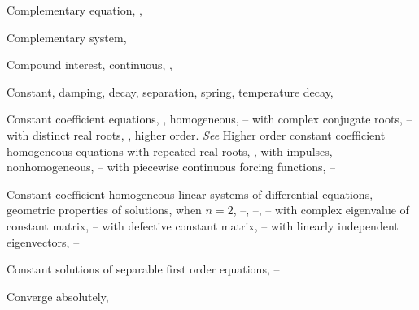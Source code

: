 \begin{theindex}
  \item Complementary equation, \pageref{eq:2.1.16}, \pageref{thmtype:9.1.5}

  \item Complementary system, \pageref{thmtype:10.7.1}

  \item Compound interest, continuous, \pageref{eq:4.1.7}, \pageref{example:4.1.2}

  \item Constant,
    \subitem damping, \pageref{eq:4.4.26}
    \subitem decay, \pageref{eq:4.1.3}
    \subitem separation, \pageref{eq:12.1.2}
    \subitem spring, \pageref{eq:6.1.1}
    \subitem temperature decay, \pageref{eq:4.2.1}

  \item Constant coefficient equations, \pageref{eq:5.2.1}, \pageref{eq:9.2.1}
    \subitem homogeneous, \pageref{eq:5.2.1}--\pageref{eq:5.3.1}
      \subsubitem with complex conjugate roots, \pageref{example:5.2.3}--\pageref{thmtype:5.2.1}
      \subsubitem with distinct real roots, \pageref{example:5.2.1}, \pageref{thmtype:5.2.1}
      \subsubitem higher order. \emph{See} Higher order constant coefficient homogeneous equations
      \subsubitem with repeated real roots, \pageref{example:5.2.2}, \pageref{thmtype:5.2.1}
    \subitem with impulses, \pageref{exer:8.6.14}--\pageref{exer:8.7.1}
    \subitem nonhomogeneous, \pageref{eq:5.4.1}--\pageref{exer:5.5.40}
    \subitem with piecewise continuous forcing functions, \pageref{eq:8.5.1}--\pageref{exer:8.5.26}

  \item Constant coefficient homogeneous linear systems of differential equations, \pageref{eq:10.4.1}--\pageref{exer:10.6.39}
    \subitem geometric properties of solutions,
      \subsubitem when $n=2$, \pageref{eq:10.4.18}--\pageref{exer:10.4.1}, \pageref{eq:10.5.19}--\pageref{exer:10.5.1}, \pageref{eq:10.6.10}--\pageref{exer:10.6.1}
    \subitem with complex eigenvalue of constant matrix, \pageref{eq:10.6.1}--\pageref{exer:10.6.1}
    \subitem with defective constant matrix, \pageref{example:10.6.1}--\pageref{exer:10.5.45}
    \subitem with linearly independent eigenvectors, \pageref{eq:10.4.1}--\pageref{exer:10.4.42}

  \item Constant solutions of separable first order equations, \pageref{example:2.2.4}--\pageref{exer:2.2.20}

  \item Converge absolutely, \pageref{thmtype:7.1.3}


\end{theindex}
